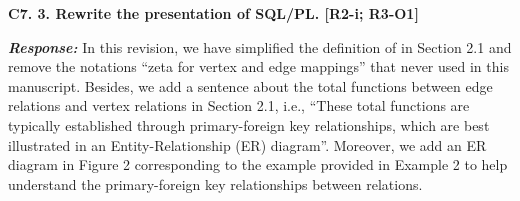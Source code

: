 \textbf{
C7. 3. Rewrite the presentation of SQL/PL. [R2-i; R3-O1]
}

\textbf{\textit{Response: }}
In this revision, we have simplified the definition of \rgmapping in Section 2.1 and remove the notations ``zeta for vertex and edge mappings'' that never used in this manuscript.
Besides, we add a sentence about the total functions between edge relations and vertex relations in Section 2.1, i.e., ``These total functions are typically established through primary-foreign key relationships, which are best illustrated in an Entity-Relationship (ER) diagram''.
Moreover, we add an ER diagram in Figure 2 corresponding to the example provided in Example 2 to help understand the primary-foreign key relationships between relations.